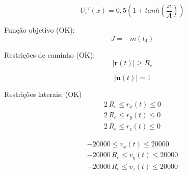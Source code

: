 \documentclass[10pt,a4paper]{article}
\begin{document}
	\begin{equation}
		U_s'(x) = 0,5 \left( 1 + tanh \left( \frac{x}{A} \right) \right)
	\end{equation}
	
	Função objetivo (OK):
	\begin{equation}
		J = -m(t_4)
	\end{equation}
	
	Restrições de caminho (OK): 
	\begin{equation}
		|\mathbf{r}(t)| \geq R_e	
	\end{equation}
	
	\begin{equation}
		|\mathbf{u}(t)| = 1
	\end{equation}
	
	Restrições laterais: (OK)
	\begin{equation}
		\begin{gathered}
			2 \, R_e \leq r_x(t) \leq 0 \\
			2 \, R_e \leq r_y(t) \leq 0 \\
			2 \, R_e \leq r_z(t) \leq 0
		\end{gathered}
	\end{equation}
	
	\begin{equation}
		\begin{gathered}
			-20000 \leq v_x(t) \leq 20000 \\
			-20000 \, R_e \leq v_y(t) \leq 20000 \\
			-20000 \, R_e \leq v_z(t) \leq 20000
		\end{gathered}
	\end{equation}
\end{document}
